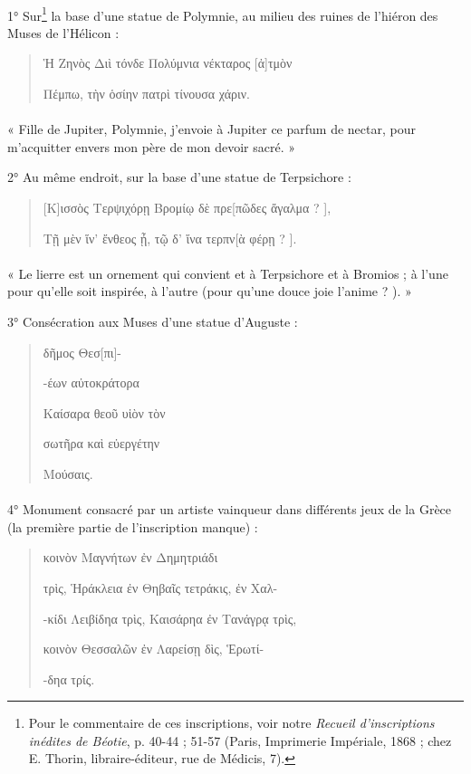 \documentclass[a4paper, 11pt, oneside, polutonikogreek, french]{article}
\begin{document}
\paragraph{}
1° Sur\footnote{Pour le commentaire de ces inscriptions, voir notre \emph{Recueil d'inscriptions inédites de Béotie}, p. 40-44 ; 51-57 (Paris, Imprimerie Impériale, 1868 ; chez E. Thorin, libraire-éditeur, rue de Médicis, 7).} la base d'une statue de Polymnie, au milieu des ruines de l'hiéron des Muses de l'Hélicon :
\begin{quotation}
Ἡ Ζηνὸς Διὶ τόνδε Πολύμνια νέκταρος [ἀ]τμὸν

\hspace*{5mm}Πέμπω, τὴν ὁσίην πατρὶ τίνουσα χάριν.
\end{quotation}
\paragraph{}
« Fille de Jupiter, Polymnie, j'envoie à Jupiter ce parfum de nectar, pour m'acquitter envers mon père de mon devoir sacré. »

2° Au même endroit, sur la base d'une statue de Terpsichore :
\begin{quotation}
[Κ]ισσὸς Τερψιχόρῃ Βρομίῳ δὲ πρε[πῶδες ἄγαλμα ? ],

\hspace*{5mm}Τῇ μὲν ἵν' ἔνθεος ᾖ, τῷ δ' ἵνα τερπν[ὰ φέρῃ ? ].
\end{quotation}
\paragraph{}
« Le lierre est un ornement qui convient et à Terpsichore et à Bromios ; à l'une pour qu'elle soit inspirée, à l'autre (pour qu'une douce joie l'anime ? ). »

3° Consécration aux Muses d'une statue d'Auguste :
\begin{quotation}
\centering
[Ὁ] δῆμος Θεσ[πι]-

-έων αὐτοκράτορα

Καίσαρα θεοῦ υἱὸν τὸν

σωτῆρα καὶ εὐεργέτην

Μούσαις.
\end{quotation}
\paragraph{}
4° Monument consacré par un artiste vainqueur dans différents jeux de la Grèce (la première partie de l'inscription manque) :
\begin{quotation}
\hspace*{5mm}κοινὸν Μαγνήτων ἐν Δημητριάδι

τρὶς, Ἡράκλεια ἐν Θηβαῖς τετράκις, ἐν Χαλ-

-κίδι Λειβίδηα τρὶς, Καισάρηα ἐν Τανάγρᾳ τρὶς,

κοινὸν Θεσσαλῶν ἐν Λαρείσῃ δὶς, Ἑρωτί-

-δηα τρίς.
\end{quotation}
\end{document}
